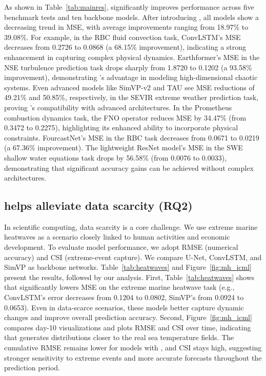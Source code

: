 As shown in Table~\ref{tab:mainres}, \method{} significantly improves performance across five benchmark tests and ten backbone models. After introducing \method{}, all models show a decreasing trend in MSE, with average improvements ranging from 18.97\% to 39.08\%. For example, in the RBC fluid convection task, ConvLSTM's MSE decreases from 0.2726 to 0.0868 (a 68.15\% improvement), indicating a strong enhancement in capturing complex physical dynamics. Earthformer’s MSE in the NSE turbulence prediction task drops sharply from 1.8720 to 0.1202 (a 93.58\% improvement), demonstrating \method{}'s advantage in modeling high-dimensional chaotic systems. Even advanced models like SimVP-v2 and TAU see MSE reductions of 49.21\% and 50.85\%, respectively, in the SEVIR extreme weather prediction task, proving \method{}'s compatibility with advanced architectures. In the Prometheus combustion dynamics task, the FNO operator reduces MSE by 34.47\% (from 0.3472 to 0.2275), highlighting its enhanced ability to incorporate physical constraints. FourcastNet's MSE in the RBC task decreases from 0.0671 to 0.0219 (a 67.36\% improvement). The lightweight ResNet model's MSE in the SWE shallow water equations task drops by 56.58\% (from 0.0076 to 0.0033), demonstrating that significant accuracy gains can be achieved without complex architectures.


\subsection{\method{} helps alleviate data scarcity (RQ2)}
In scientific computing, data scarcity is a core challenge. We use extreme marine heatwaves as a scenario closely linked to human activities and economic development. To evaluate model performance, we adopt RMSE (numerical accuracy) and CSI (extreme-event capture). We compare U-Net, ConvLSTM, and SimVP as backbone networks. Table~\ref{tab:heatwaves} and Figure~\ref{fig:mh_icml} present the results, followed by our analysis. First, Table~\ref{tab:heatwaves} shows that \method{} significantly lowers MSE on the extreme marine heatwave task (e.g., ConvLSTM’s error decreases from 0.1204 to 0.0802, SimVP’s from 0.0924 to 0.0653). Even in data-scarce scenarios, these models better capture dynamic changes and improve overall prediction accuracy. Second, Figure~\ref{fig:mh_icml} compares day-10 visualizations and plots RMSE and CSI over time, indicating that \method{} generates distributions closer to the real sea temperature fields. The cumulative RMSE remains lower for models with \method{}, and CSI stays high, suggesting stronger sensitivity to extreme events and more accurate forecasts throughout the prediction period.




